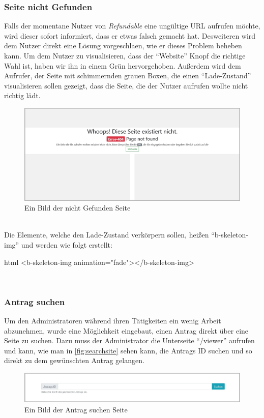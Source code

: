 \subsubsection{Seite nicht Gefunden}
\label{chapter:implementierung-frontend-komponenten-notfound}
Falls der momentane Nutzer von \textit{Refundable} eine ungültige URL aufrufen möchte, wird dieser sofort informiert, dass er etwas falsch gemacht hat. Desweiteren wird dem Nutzer direkt eine Lösung vorgeschlaen, wie er dieses Problem beheben kann. Um dem Nutzer zu visualisieren, dass der \enquote{Website} Knopf die richtige Wahl ist, haben wir ihn in einem Grün hervorgehoben. Außerdem wird dem Aufrufer, der Seite mit schimmernden grauen Boxen, die einen \enquote{Lade-Zustand} visualisieren sollen gezeigt, dass die Seite, die der Nutzer aufrufen wollte nicht richtig lädt.
\begin{figure}[H]
	\centering
	\includegraphics[width=1\linewidth]{images/website/notfound}
	\caption[Neuer Schulantrag]{Ein Bild der nicht Gefunden Seite}
	\label{fig:notfoundsite}
\end{figure}
~\\
Die Elemente, welche den Lade-Zustand verkörpern sollen, heißen \enquote{b-skeleton-img} und werden wie folgt erstellt:
\begin{code}{html}
	<b-skeleton-img animation="fade"></b-skeleton-img>
\end{code}
	\label{list:codeskeleton} ~\\

\newpage
\subsubsection{Antrag suchen}
\label{chapter:implementierung-frontend-komponenten-suchen}
Um den Administratoren während ihren Tätigkeiten ein wenig Arbeit abzunehmen, wurde eine Möglichkeit eingebaut, einen Antrag direkt über eine Seite zu suchen. Dazu muss der Administrator die Unterseite \enquote{/viewer} aufrufen und kann, wie man in \autoref{fig:searchsite} sehen kann, die Antrags ID suchen und so direkt zu dem gewünschten Antrag gelangen.
\begin{figure}[H]
	\centering
	\includegraphics[width=1\linewidth]{images/website/search}
	\caption[Neuer Schulantrag]{Ein Bild der Antrag suchen Seite}
	\label{fig:searchsite}
\end{figure}
~\\

